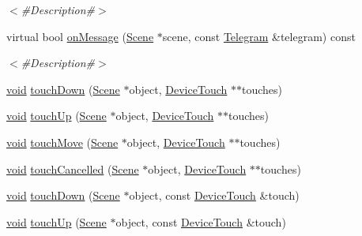 \begin{DoxyCompactItemize}
\begin{DoxyCompactList}\small\item\em $<$\#\+Description\#$>$ \end{DoxyCompactList}\item 
virtual bool \mbox{\hyperlink{classnjli_1_1_scene_state_add899a791145ac1a06ee1f54d0b60196}{on\+Message}} (\mbox{\hyperlink{classnjli_1_1_scene}{Scene}} $\ast$scene, const \mbox{\hyperlink{classnjli_1_1_telegram}{Telegram}} \&telegram) const
\begin{DoxyCompactList}\small\item\em $<$\#\+Description\#$>$ \end{DoxyCompactList}\item 
\mbox{\hyperlink{_thread_8h_af1e856da2e658414cb2456cb6f7ebc66}{void}} \mbox{\hyperlink{classnjli_1_1_scene_state_aada7738b0ccc928bc8f258de1f046738}{touch\+Down}} (\mbox{\hyperlink{classnjli_1_1_scene}{Scene}} $\ast$object, \mbox{\hyperlink{classnjli_1_1_device_touch}{Device\+Touch}} $\ast$$\ast$touches)
\item 
\mbox{\hyperlink{_thread_8h_af1e856da2e658414cb2456cb6f7ebc66}{void}} \mbox{\hyperlink{classnjli_1_1_scene_state_ade8105306ea69c75496a62a49ddb0352}{touch\+Up}} (\mbox{\hyperlink{classnjli_1_1_scene}{Scene}} $\ast$object, \mbox{\hyperlink{classnjli_1_1_device_touch}{Device\+Touch}} $\ast$$\ast$touches)
\item 
\mbox{\hyperlink{_thread_8h_af1e856da2e658414cb2456cb6f7ebc66}{void}} \mbox{\hyperlink{classnjli_1_1_scene_state_a9066440c12710e56d460f3ba64e73b00}{touch\+Move}} (\mbox{\hyperlink{classnjli_1_1_scene}{Scene}} $\ast$object, \mbox{\hyperlink{classnjli_1_1_device_touch}{Device\+Touch}} $\ast$$\ast$touches)
\item 
\mbox{\hyperlink{_thread_8h_af1e856da2e658414cb2456cb6f7ebc66}{void}} \mbox{\hyperlink{classnjli_1_1_scene_state_a68e927da0cdc2b8806fae344b75e3f61}{touch\+Cancelled}} (\mbox{\hyperlink{classnjli_1_1_scene}{Scene}} $\ast$object, \mbox{\hyperlink{classnjli_1_1_device_touch}{Device\+Touch}} $\ast$$\ast$touches)
\item 
\mbox{\hyperlink{_thread_8h_af1e856da2e658414cb2456cb6f7ebc66}{void}} \mbox{\hyperlink{classnjli_1_1_scene_state_a091f6ee2bbc0f250362a17177b108300}{touch\+Down}} (\mbox{\hyperlink{classnjli_1_1_scene}{Scene}} $\ast$object, const \mbox{\hyperlink{classnjli_1_1_device_touch}{Device\+Touch}} \&touch)
\item 
\mbox{\hyperlink{_thread_8h_af1e856da2e658414cb2456cb6f7ebc66}{void}} \mbox{\hyperlink{classnjli_1_1_scene_state_a4201c0cc0281fa0a0686bc18508f3ee4}{touch\+Up}} (\mbox{\hyperlink{classnjli_1_1_scene}{Scene}} $\ast$object, const \mbox{\hyperlink{classnjli_1_1_device_touch}{Device\+Touch}} \&touch)

\end{DoxyCompactItemize}
